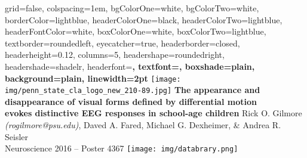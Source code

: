 \documentclass[landscape,final,paperwidth=72in,paperheight=41.5in,fontscale=0.285]{baposter}
\begin{document}



\begin{poster}%
  {
  grid=false,
  colspacing=1em,
  bgColorOne=white,
  bgColorTwo=white,
  borderColor=lightblue,
  headerColorOne=black,
  headerColorTwo=lightblue,
  headerFontColor=white,
  boxColorOne=white,
  boxColorTwo=lightblue,
  textborder=roundedleft,
  eyecatcher=true,
  headerborder=closed,
  headerheight=0.12\textheight,
  columns=5, %
  headershape=roundedright,
  headershade=shadelr,
  headerfont=\Large\bf\textsc, %
  textfont={\setlength{\parindent}{1.5em}},
  boxshade=plain,
  background=plain,
  linewidth=2pt
  }
  {\texttt{[image: img/penn\_state\_cla\_logo\_new\_210-89.jpg]}}
  {\bf{The appearance and disappearance of visual forms defined by differential motion \\ evokes distinctive EEG responses in school-age children} \vspace{0.2em}}
  {Rick O. Gilmore \emph{(rogilmore@psu.edu)}, Daved A. Fared, Michael G. Dexheimer, \& Andrea R. Seisler\\ \vspace{0.2em}
  Neuroscience 2016 -- Poster 4367}
 {\texttt{[image: img/databrary.png]}}


\end{poster}
\end{document}
